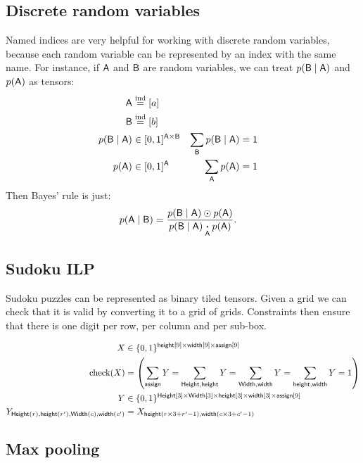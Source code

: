 \documentclass{article}
\begin{document}
\subsection{Discrete random variables}

Named indices are very helpful for working with discrete random variables, because each random variable can be represented by an index with the same name. For instance, if $\mathsf{A}$ and $\mathsf{B}$ are random variables, we can treat $p(\mathsf{B} \mid \mathsf{A})$ and $p(\mathsf{A})$ as tensors:
\begin{align*}
\mathsf{A} &\overset{\textrm{ind}}= [a] \\
\mathsf{B} &\overset{\textrm{ind}}= [b] \\
p(\mathsf{B} \mid \mathsf{A}) &\in [0, 1]^{\mathsf{A} \times \mathsf{B}} & \sum\limits_{\mathsf{B}} p(\mathsf{B}\mid \mathsf{A}) &= 1 \\
p(\mathsf{A}) &\in [0, 1]^{\mathsf{A}} & \sum\limits_{\mathsf{A}} p(\mathsf{A}) &= 1
\end{align*}
Then Bayes' rule is just:
\begin{align*}
p(\mathsf{A} \mid \mathsf{B}) &= \frac{p(\mathsf{B} \mid \mathsf{A}) \odot p(\mathsf{A})}{p(\mathsf{B} \mid \mathsf{A}) \mathbin{\mathop{\boldsymbol\cdot}\limits_{\mathsf{A}}} p(\mathsf{A})}.
\end{align*}

\subsection{Sudoku ILP}

Sudoku puzzles can be represented as  binary tiled tensors.
Given a grid we can check that it is valid by converting it to a grid of grids. 
Constraints then ensure that there is one digit per row, per column and per sub-box. 

\begin{align*} 
X &\in \{0, 1\}^{\mathsf{height}[9] \times \mathsf{width}[9] \times \mathsf{assign}[9]}  \\
\text{check}(X) &=
\left(\sum\limits_{\mathsf{assign}} Y = 
\sum\limits_{\mathsf{Height, height}} Y = 
\sum\limits_{\mathsf{Width, width}} Y =  
\sum\limits_{\mathsf{height, width}} Y = 1 \right) \\
Y &\in \{0, 1\}^{\mathsf{Height}[3] \times \mathsf{Width}[3] \times \mathsf{height}[3] \times \mathsf{width}[3] \times \mathsf{assign}[9]}  \\
Y_{\mathsf{Height}(r), \mathsf{height}(r'), \mathsf{Width}(c), \mathsf{width}(c')} &= X_{\mathsf{height}(r\times 3 + r'-1), \mathsf{width}(c\times3 + c'-1)}
\end{align*} 


\subsection{Max pooling}
\end{document}

